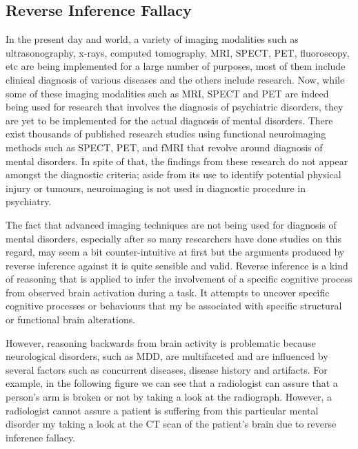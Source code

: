 ﻿\documentclass[12pt]{article}
\begin{document}
\subsection{Reverse Inference Fallacy}

In the present day and world, a variety of imaging modalities such as
ultrasonography, x-rays, computed tomography, MRI, SPECT, PET,
fluoroscopy, etc are being implemented for a large number of purposes,
most of them include clinical diagnosis of various diseases and the
others include research. Now, while some of these imaging modalities
such as MRI, SPECT and PET are indeed being used for research that
involves the diagnosis of psychiatric disorders, they are yet to be
implemented for the actual diagnosis of mental disorders. There exist
thousands of published research studies using functional neuroimaging
methods such as SPECT, PET, and fMRI that revolve around diagnosis of
mental disorders. In spite of that, the findings from these research
do not appear amongst the diagnostic criteria; aside from its use to
identify potential physical injury or tumours, neuroimaging is not
used in diagnostic procedure in psychiatry.

The fact that advanced imaging techniques are not being used for
diagnosis of mental disorders, especially after so many researchers
have done studies on this regard, may seem a bit counter-intuitive at
first but the arguments produced by reverse inference against it is
quite sensible and valid. Reverse inference is a kind of reasoning
that is applied to infer the involvement of a specific cognitive
process from observed brain activation during a task. It attempts to
uncover specific cognitive processes or behaviours that my be
associated with specific structural or functional brain alterations.

However, reasoning backwards from brain activity is problematic
because neurological disorders, such as MDD, are multifaceted and are
influenced by several factors such as concurrent diseases, disease
history and artifacts. For example, in the following figure we can see
that a radiologist can assure that a person’s arm is broken or not by
taking a look at the radiograph. However, a radiologist cannot assure
a patient is suffering from this particular mental disorder my taking
a look at the CT scan of the patient’s brain due to reverse inference
fallacy.
\end{document}
